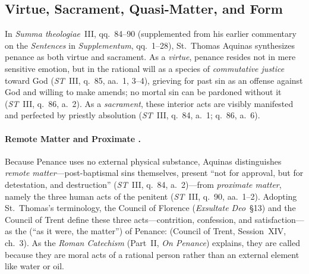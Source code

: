 \subsection{Virtue, Sacrament, Quasi-Matter, and Form}
\label{subsec:penance-constitution}

In \emph{Summa theologiae}~III, qq.~84--90 (supplemented from his earlier commentary on the \emph{Sentences} in \emph{Supplementum}, qq.~1--28), St.~Thomas Aquinas synthesizes penance as both virtue and sacrament. As a \emph{virtue}, penance resides not in mere sensitive emotion, but in the rational will as a species of \emph{commutative justice} toward God (\emph{ST}~III, q.~85, aa.~1, 3--4), grieving for past sin as an offense against God and willing to make amends; no mortal sin can be pardoned without it (\emph{ST}~III, q.~86, a.~2). As a \emph{sacrament}, these interior acts are visibly manifested and perfected by priestly absolution (\emph{ST}~III, q.~84, a.~1; q.~86, a.~6).

\paragraph{Remote Matter and Proximate .}
Because Penance uses no external physical substance, Aquinas distinguishes \emph{remote matter}---post-baptismal sins themselves, present ``not for approval, but for detestation, and destruction'' (\emph{ST}~III, q.~84, a.~2)---from \emph{proximate matter}, namely the three human acts of the penitent (\emph{ST}~III, q.~90, aa.~1--2). Adopting St.~Thomas's terminology, the Council of Florence (\emph{Exsultate Deo}~\S13) and the Council of Trent define these three acts---contrition, confession, and satisfaction---as the  (``as it were, the matter'') of Penance:  (Council of Trent, Session~XIV, ch.~3). As the \emph{Roman Catechism} (Part~II, \emph{On Penance}) explains, they are called  because they are moral acts of a rational person rather than an external element like water or oil.

